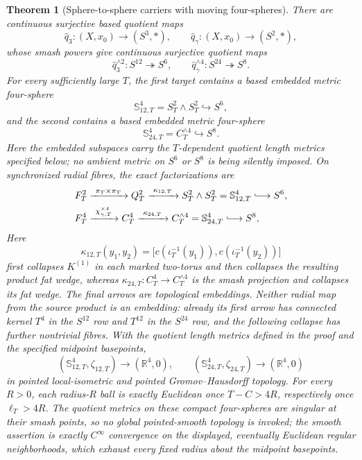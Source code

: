 \documentclass[11pt,letterpaper]{article}
\numberwithin{equation}{section}
\newtheorem{theorem}{Theorem}[section]
\theoremstyle{definition}
\theoremstyle{remark}
\newcommand{\R}{\mathbb R}
\begin{document}
\begin{theorem}[Sphere-to-sphere carriers with moving four-spheres]
\label{thm:sphere-carriers}
There are continuous surjective based quotient maps
\[
 \widehat q_3:(X,x_0)\longrightarrow(S^3,*),
 \qquad
 \widehat q_\gamma:(X,x_0)\longrightarrow(S^2,*),
\]
whose smash powers give continuous surjective quotient maps
\begin{equation}
 \widehat q_3^{\wedge2}:S^{12}\twoheadrightarrow S^6,
 \qquad
 \widehat q_\gamma^{\wedge4}:S^{24}\twoheadrightarrow S^8.
 \label{eq:sphere-carrier-maps}
\end{equation}
For every sufficiently large \(T\), the first target contains a based
embedded metric four-sphere
\[
 \mathbb S_{12,T}^4=S_T^2\wedge S_T^2\hookrightarrow S^6,
\]
and the second contains a based embedded metric four-sphere
\[
 \mathbb S_{24,T}^4=C_T^{\wedge4}\hookrightarrow S^8.
\]
Here the embedded subspaces carry the \(T\)-dependent quotient length
metrics specified below; no ambient metric on \(S^6\) or \(S^8\) is being
silently imposed.
On synchronized radial fibres, the exact factorizations are
\begin{align}
 F_T^2&\xrightarrow{\ \pi_T\times\pi_T\ }Q_T^2
 \xrightarrow{\ \kappa_{12,T}\ }
 S_T^2\wedge S_T^2=\mathbb S_{12,T}^4
 \lhook\joinrel\longrightarrow S^6,
 \label{eq:S12-moving-sphere-map}\\
 F_T^4&\xrightarrow{\ \chi_{\gamma,T}^{\times4}\ }
 C_T^4\xrightarrow{\ \kappa_{24,T}\ }
 C_T^{\wedge4}=\mathbb S_{24,T}^4
 \lhook\joinrel\longrightarrow S^8,
 \label{eq:S24-moving-sphere-map}
\end{align}
Here
\[
 \kappa_{12,T}(y_1,y_2)
 =\bigl[c(\iota_T^{-1}(y_1)),c(\iota_T^{-1}(y_2))\bigr]
\]
first collapses \(K^{(1)}\) in each marked two-torus and then collapses the
resulting product fat wedge, whereas
\(\kappa_{24,T}:C_T^4\to C_T^{\wedge4}\) is the smash projection and
collapses its fat wedge.  The final arrows are topological embeddings.
Neither radial map from the source product is an embedding: already its
first arrow has connected kernel \(T^4\) in the \(S^{12}\) row and
\(T^{12}\) in the \(S^{24}\) row, and the following collapse has further
nontrivial fibres.
With the quotient length metrics defined in the proof and the specified
midpoint basepoints,
\begin{equation}
 (\mathbb S_{12,T}^4,\zeta_{12,T})\longrightarrow(\R^4,0),
 \qquad
 (\mathbb S_{24,T}^4,\zeta_{24,T})\longrightarrow(\R^4,0)
 \label{eq:moving-sphere-limits}
\end{equation}
in pointed local-isometric and pointed Gromov--Hausdorff topology.  For
every \(R>0\), each radius-\(R\) ball is exactly Euclidean once
\(T-C>4R\), respectively once \(\ell_T>4R\).  The quotient metrics on
these compact four-spheres are singular at their smash points, so no
global pointed-smooth topology is invoked; the smooth assertion is exactly
\(C^\infty\) convergence on the displayed, eventually Euclidean regular
neighborhoods, which exhaust every fixed radius about the midpoint
basepoints.
\end{theorem}
\end{document}
